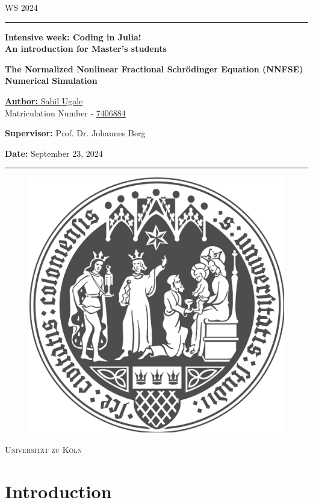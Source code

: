 \documentclass[8pt, a4paper, twocolumn]{article}
\begin{document}
\begin{titlepage}
	WS 2024
	\vspace{1cm}
	\begin{center}
		\rule{\textwidth}{0.4pt}

		\vspace{1cm}
		\textbf{\Large Intensive week: Coding in Julia!\\[1ex]
		    \Large{An introduction for Master's students}}

		\vspace{1cm}
		\textbf{\Huge The Normalized Nonlinear Fractional Schrödinger Equation (NNFSE)\\[1ex]
				\Large Numerical Simulation}
		    
		\vspace{1cm}
		{\Large\underline{\textbf{Author:} Sahil Ugale}}\\
		\vspace{0.2cm}
		Matriculation Number - \underline{7406884}
		
		\vspace{0.5cm}
		{\large{
		\textbf{Supervisor:} Prof. Dr. Johannes Berg
		
		\vspace{0.5cm}
		
		\textbf{Date:} September 23, 2024}}
        \vspace{1cm}
		\rule{\textwidth}{0.4pt}
        \begin{figure}[hb]
		    \centering
		    \includegraphics[width=0.4\linewidth]{images/uni_koeln.png}
		\end{figure}
		\Huge{\textsc{Universität zu Köln}}

	\end{center}
\end{titlepage}

\tableofcontents
\hrulefill

\section{Introduction}
\end{document}
